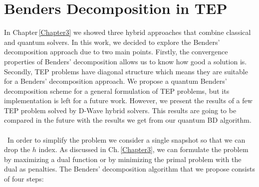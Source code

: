 \section{Benders Decomposition in TEP}
In Chapter\,\ref{Chapter3} we showed three hybrid approaches that combine classical and quantum solvers. In this work, we decided to explore the Benders' decomposition approach due to two main points. Firstly, the convergence properties of Benders' decomposition allows us to know how good a solution is. Secondly, TEP problems have diagonal structure which means they are suitable for a Benders' decomposition approach. We propose a quantum Benders' decomposition scheme for a general formulation of TEP problems, but its implementation is left for a future work. However, we present the results of a few TEP problem solved by D-Wave hybrid solvers. This results are going to be compared in the future with the results we get from our quantum BD algorithm.\\\\\
In order to simplify the problem we consider a single snapshot so that we can drop the $h$ index. As discussed in Ch.\,\ref{Chapter3}, we can formulate the problem by maximizing a dual function or by minimizing the primal problem with the dual as penalties. The Benders' decomposition algorithm that we propose consists of four steps:
